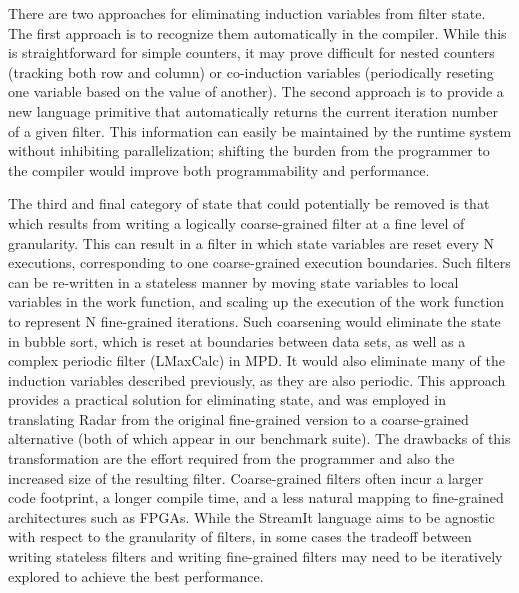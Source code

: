 There are two approaches for eliminating induction variables from
filter state.  The first approach is to recognize them automatically
in the compiler.  While this is straightforward for simple counters,
it may prove difficult for nested counters (tracking both row and
column) or co-induction variables (periodically reseting one variable
based on the value of another).  The second approach is to provide a
new language primitive that automatically returns the current
iteration number of a given filter.  This information can easily be
maintained by the runtime system without inhibiting parallelization;
shifting the burden from the programmer to the compiler would improve
both programmability and performance.

The third and final category of state that could potentially be
removed is that which results from writing a logically coarse-grained
filter at a fine level of granularity.  This can result in a filter in
which state variables are reset every N executions, corresponding to
one coarse-grained execution boundaries.  Such filters can be
re-written in a stateless manner by moving state variables to local
variables in the work function, and scaling up the execution of the
work function to represent N fine-grained iterations.  Such coarsening
would eliminate the state in bubble sort, which is reset at boundaries
between data sets, as well as a complex periodic filter (LMaxCalc) in
MPD.  It would also eliminate many of the induction variables
described previously, as they are also periodic.  This approach
provides a practical solution for eliminating state, and was employed
in translating Radar from the original fine-grained version to a
coarse-grained alternative (both of which appear in our benchmark
suite).  The drawbacks of this transformation are the effort required
from the programmer and also the increased size of the resulting
filter.  Coarse-grained filters often incur a larger code footprint, a
longer compile time, and a less natural mapping to fine-grained
architectures such as FPGAs.  While the StreamIt language aims to be
agnostic with respect to the granularity of filters, in some cases the
tradeoff between writing stateless filters and writing fine-grained
filters may need to be iteratively explored to achieve the best
performance.

